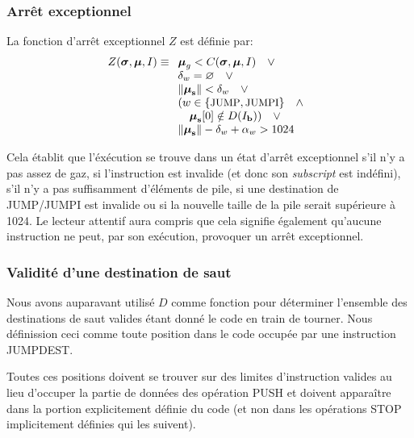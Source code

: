 \documentclass[9pt,oneside]{amsart}
\begin{document}
\begin{multicols}{2}
\subsubsection{Arrêt exceptionnel}

La fonction d'arrêt exceptionnel $Z$ est définie par:
\begin{equation}
Z(\boldsymbol{\sigma}, \boldsymbol{\mu}, I) \equiv
\begin{array}[t]{l}
\boldsymbol{\mu}_g < C(\boldsymbol{\sigma}, \boldsymbol{\mu}, I) \quad \vee \\
\mathbf{\delta}_w = \varnothing \quad \vee \\
\lVert\boldsymbol{\mu}_\mathbf{s}\rVert < \mathbf{\delta}_w \quad \vee \\
( w \in \{ \text{\small JUMP}, \text{\small JUMPI} \} \quad \wedge \\ \quad \boldsymbol{\mu}_\mathbf{s}[0] \notin D(I_\mathbf{b}) ) \quad \vee \\
\lVert\boldsymbol{\mu}_\mathbf{s}\rVert - \mathbf{\delta}_w + \mathbf{\alpha}_w > 1024 \quad
\end{array}
\end{equation}

Cela établit que l'éxécution se trouve dans un état d'arrêt exceptionnel s'il n'y a pas assez de gaz, si l'instruction est invalide (et donc son \textit{subscript} est indéfini), s'il n'y a pas suffisamment d'éléments de pile, si une destination de {\small JUMP}/{\small JUMPI} est invalide ou si la nouvelle taille de la pile serait supérieure à 1024. Le lecteur attentif aura compris que cela signifie également qu'aucune instruction ne peut, par son exécution, provoquer un arrêt exceptionnel.

\subsubsection{Validité d'une destination de saut}

Nous avons auparavant utilisé $D$ comme fonction pour déterminer l'ensemble des destinations de saut valides étant donné le code en train de tourner. Nous définission ceci comme toute position dans le code occupée par une instruction {\small JUMPDEST}.

Toutes ces positions doivent se trouver sur des limites d'instruction valides au lieu d'occuper la partie de données des opération {\small PUSH} et doivent apparaître dans la portion explicitement définie du code (et non dans les opérations {\small STOP} implicitement définies qui les suivent).


\end{multicols}
\end{document}

